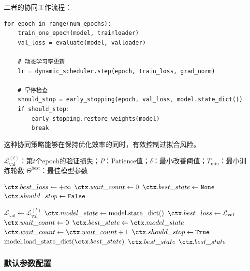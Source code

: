 二者的协同工作流程：

\begin{verbatim}
for epoch in range(num_epochs):
    train_one_epoch(model, trainloader)
    val_loss = evaluate(model, valloader)
    
    # 动态学习率更新
    lr = dynamic_scheduler.step(epoch, train_loss, grad_norm)
    
    # 早停检查
    should_stop = early_stopping(epoch, val_loss, model.state_dict())
    if should_stop:
        early_stopping.restore_weights(model)
        break
\end{verbatim}

这种协同策略能够在保持优化效率的同时，有效控制过拟合风险。

\begin{algorithm}
  \centering
  \caption{早停机制算法}
  \label{alg:early_stopping}
  \small
  \begin{algorithmic}[1]
  \REQUIRE $\mathcal{L}_{\text{val}}^{(t)}$：第$t$个epoch的验证损失；$P$：Patience值；$\delta$：最小改善阈值；$T_{\text{min}}$：最小训练轮数
  \ENSURE $\Theta^{\text{best}}$：最佳模型参数

  \STATE {}
  \STATE $\ctx.best\_loss \leftarrow +\infty$
  \STATE $\ctx.wait\_count \leftarrow 0$
  \STATE $\ctx.best\_state \leftarrow \texttt{None}$
  \STATE $\ctx.should\_stop \leftarrow \texttt{False}$

  \STATE {}
    \STATE {}
    \STATE $\mathcal{L}_{\text{val}} \leftarrow \mathcal{L}_{\text{val}}^{(t)}$
    \STATE $\ctx.model\_state \leftarrow \text{model.state\_dict()}$
    \STATE {}
      \STATE $\ctx.best\_loss \leftarrow \mathcal{L}_{\text{val}}$
      \STATE $\ctx.wait\_count \leftarrow 0$
      \STATE $\ctx.best\_state \leftarrow \ctx.model\_state$
    \ELSE
      \STATE $\ctx.wait\_count \leftarrow \ctx.wait\_count + 1$
    \ENDIF
    \STATE {}
      \STATE $\ctx.should\_stop \leftarrow \texttt{True}$
      \STATE {}
      \STATE $\text{model.load\_state\_dict}(\ctx.best\_state)$
      \RETURN $\ctx.best\_state$
    \ENDIF
  \ENDFOR
  \RETURN $\ctx.best\_state$
  \end{algorithmic}
\end{algorithm}

\subsubsection{默认参数配置}

